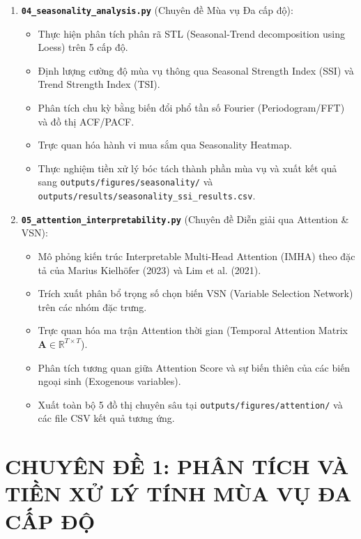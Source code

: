 \documentclass[12pt,a4paper,oneside]{article}
\begin{document}
\begin{enumerate}
    \item \textbf{\texttt{04\_seasonality\_analysis.py}} (Chuyên đề Mùa vụ Đa cấp độ):
    \begin{itemize}
        \item Thực hiện phân tích phân rã STL (Seasonal-Trend decomposition using Loess) trên 5 cấp độ.
        \item Định lượng cường độ mùa vụ thông qua Seasonal Strength Index (SSI) và Trend Strength Index (TSI).
        \item Phân tích chu kỳ bằng biến đổi phổ tần số Fourier (Periodogram/FFT) và đồ thị ACF/PACF.
        \item Trực quan hóa hành vi mua sắm qua Seasonality Heatmap.
        \item Thực nghiệm tiền xử lý bóc tách thành phần mùa vụ và xuất kết quả sang \texttt{outputs/figures/seasonality/} và \texttt{outputs/results/seasonality\_ssi\_results.csv}.
    \end{itemize}

    \item \textbf{\texttt{05\_attention\_interpretability.py}} (Chuyên đề Diễn giải qua Attention \& VSN):
    \begin{itemize}
        \item Mô phỏng kiến trúc Interpretable Multi-Head Attention (IMHA) theo đặc tả của Marius Kielh\"{o}fer (2023) và Lim et al. (2021).
        \item Trích xuất phân bổ trọng số chọn biến VSN (Variable Selection Network) trên các nhóm đặc trưng.
        \item Trực quan hóa ma trận Attention thời gian (Temporal Attention Matrix $\mathbf{A} \in \mathbb{R}^{T \times T}$).
        \item Phân tích tương quan giữa Attention Score và sự biến thiên của các biến ngoại sinh (Exogenous variables).
        \item Xuất toàn bộ 5 đồ thị chuyên sâu tại \texttt{outputs/figures/attention/} và các file CSV kết quả tương ứng.
    \end{itemize}
\end{enumerate}

\newpage
\section{CHUYÊN ĐỀ 1: PHÂN TÍCH VÀ TIỀN XỬ LÝ TÍNH MÙA VỤ ĐA CẤP ĐỘ}
\label{sec:chuyen_de_mua_vu}
\end{document}
